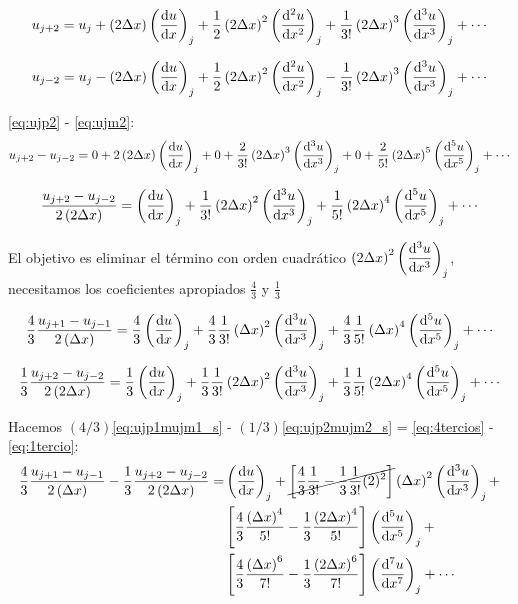 \documentclass{article}
\numberwithin{figure}{section}
\numberwithin{equation}{section} %
\begin{document}
\begin{equation}
u_{j+2} = u_j + \dDx\derord{u}{x} +
\frac12\dDx^2\derord[2]{u}{x} +
\frac1{3!}\dDx^3\derord[3]{u}{x} + \cdots
\label{eq:ujp2}
\end{equation}

\begin{equation}
u_{j-2} = u_j - \dDx\derord{u}{x} +
\frac12\dDx^2\derord[2]{u}{x} -
\frac1{3!}\dDx^3\derord[3]{u}{x} + \cdots
\label{eq:ujm2}
\end{equation}

\eqref{eq:ujp2} - \eqref{eq:ujm2}:
\begin{equation}
u_{j+2} - u_{j-2} = 0 + 2\dDx\derord{u}{x} + 0 +
\frac2{3!}\dDx^3\derord[3]{u}{x} + 0 +
\frac2{5!}\dDx^5\derord[5]{u}{x} + \cdots
\label{eq:ujp2mujm2}
\end{equation}

\begin{equation}
\frac{u_{j+2} - u_{j-2}}{2\dDx} = \derord{u}{x} +
\frac1{3!}\dDx^2\derord[3]{u}{x} +
\frac1{5!}\dDx^4\derord[5]{u}{x} + \cdots
\label{eq:ujp2mujm2_s}
\end{equation}

El objetivo es eliminar el término con orden cuadrático
$\dDx^2\derord[3]{u}{x}$, 
necesitamos los coeficientes apropiados $\frac43$ y $\frac13$


\begin{equation}
\def\coef{\frac43}
\coef\frac{u_{j+1} - u_{j-1}}{2\Dx} = \coef\derord{u}{x} +
\coef\frac1{3!}\Dx^2\derord[3]{u}{x} +
\coef\frac1{5!}\Dx^4\derord[5]{u}{x} + \cdots
\label{eq:4tercios}
\end{equation}

\begin{equation}
\def\coef{\frac13}
\coef\frac{u_{j+2} - u_{j-2}}{2\dDx} = \coef\derord{u}{x} +
\coef\frac1{3!}\dDx^2\derord[3]{u}{x} +
\coef\frac1{5!}\dDx^4\derord[5]{u}{x} + \cdots
\label{eq:1tercio}
\end{equation}

Hacemos $(4/3)$\eqref{eq:ujp1mujm1_s} -
$(1/3)$\eqref{eq:ujp2mujm2_s} =
\eqref{eq:4tercios} - \eqref{eq:1tercio}:
\begin{equation}
\def\u{\frac13}
\def\c{\frac43}
    \begin{split}
\c\frac{u_{j+1} - u_{j-1}}{2\Dx}-\u\frac{u_{j+2} -
u_{j-2}}{2\dDx} = & \derord{u}{x} + \cancel{ \left[
\c\frac{1}{3!} - \u\frac{1}{3!}(2)^2 \right] }
\Dx^2\derord[3]{u}{x} + \\
& \left[ \c\frac{\Dx^4}{5!} - \u\frac{\dDx^4}{5!}
\right]\derord[5]{u}{x} + \\
& \left[ \c\frac{\Dx^6}{7!} - \u\frac{\dDx^6}{7!}
\right]\derord[7]{u}{x} + \cdots
    \end{split}
\label{eq:o4}
\end{equation}
\end{document}
